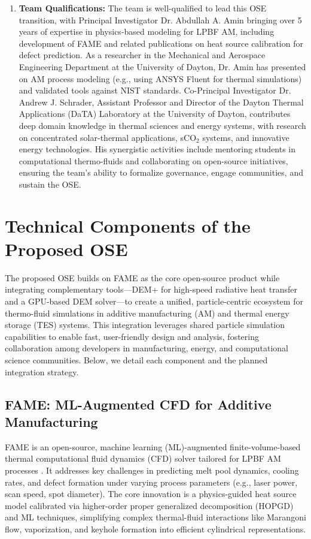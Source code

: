 \documentclass[11pt]{article}
\begin{document}
\begin{enumerate}
    \item \textbf{Team Qualifications:} The team is well-qualified to lead this OSE transition, with Principal Investigator Dr. Abdullah A. Amin bringing over 5 years of expertise in physics-based modeling for LPBF AM, including development of FAME and related publications on heat source calibration for defect prediction. As a researcher in the Mechanical and Aerospace Engineering Department at the University of Dayton, Dr. Amin has presented on AM process modeling (e.g., using ANSYS Fluent for thermal simulations) and validated tools against NIST standards. Co-Principal Investigator Dr. Andrew J. Schrader, Assistant Professor and Director of the Dayton Thermal Applications (DaTA) Laboratory at the University of Dayton, contributes deep domain knowledge in thermal sciences and energy systems, with research on concentrated solar-thermal applications, sCO$_2$ systems, and innovative energy technologies. His synergistic activities include mentoring students in computational thermo-fluids and collaborating on open-source initiatives, ensuring the team's ability to formalize governance, engage communities, and sustain the OSE.
\end{enumerate}
\section*{Technical Components of the Proposed OSE}
\vspace{-3pt}
\noindent
The proposed OSE builds on FAME as the core open-source product while integrating complementary tools—DEM+ for high-speed radiative heat transfer and a GPU-based DEM solver—to create a unified, particle-centric ecosystem for thermo-fluid simulations in additive manufacturing (AM) and thermal energy storage (TES) systems. This integration leverages shared particle simulation capabilities to enable fast, user-friendly design and analysis, fostering collaboration among developers in manufacturing, energy, and computational science communities. Below, we detail each component and the planned integration strategy.

\subsection*{FAME: ML-Augmented CFD for Additive Manufacturing}
FAME is an open-source, machine learning (ML)-augmented finite-volume-based thermal computational fluid dynamics (CFD) solver tailored for LPBF AM processes \cite{aminPhysicsGuidedHeat2024}. It addresses key challenges in predicting melt pool dynamics, cooling rates, and defect formation under varying process parameters (e.g., laser power, scan speed, spot diameter). The core innovation is a physics-guided heat source model calibrated via higher-order proper generalized decomposition (HOPGD) and ML techniques, simplifying complex thermal-fluid interactions like Marangoni flow, vaporization, and keyhole formation into efficient cylindrical representations.
\end{document}
